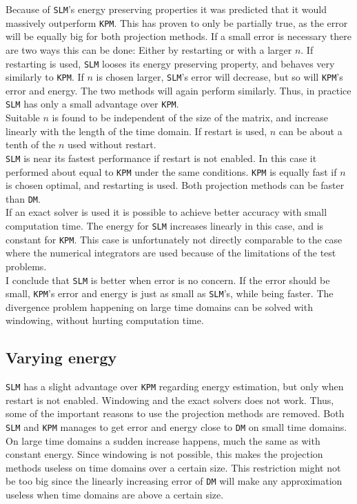 \noindent Because of \texttt{SLM}'s energy preserving properties it was predicted that it would massively outperform \texttt{KPM}. This has proven to only be partially true, as the error will be equally big for both projection methods.
If a small error is necessary there are two ways this can be done: Either by restarting or with a larger $n$. If restarting is used, \texttt{SLM} looses its energy preserving property, and behaves very similarly to \texttt{KPM}. If $n$ is chosen larger, \texttt{SLM}'s error will decrease, but so will \texttt{KPM}'s error and energy. The two methods will again perform similarly. Thus, in practice \texttt{SLM} has only a small advantage over \texttt{KPM}.\\

\noindent Suitable $n$ is found to be independent of the size of the matrix, and increase linearly with the length of the time domain. If restart is used, $n$ can be about a tenth of the $n$ used without restart.\\

\noindent \texttt{SLM} is near its fastest performance if restart is not enabled. In this case it performed about equal to \texttt{KPM} under the same conditions. \texttt{KPM} is equally fast if $n$ is chosen optimal, and restarting is used. Both projection methods can be faster than \texttt{DM}. \\

\noindent If an exact solver is used it is possible to achieve better accuracy with small computation time. The energy for \texttt{SLM} increases linearly in this case, and is constant for \texttt{KPM}. This case is unfortunately not directly comparable to the case where the numerical integrators are used because of the limitations of the test problems. \\

\noindent I conclude that \texttt{SLM} is better when error is no concern. If the error should be small, \texttt{KPM}'s error and energy is just as small as \texttt{SLM}'s, while being faster. The divergence problem happening on large time domains can be solved with windowing, without hurting computation time. %
\subsection{Varying energy} %
\texttt{SLM} has a slight advantage over \texttt{KPM} regarding energy estimation, but only when restart is not enabled. 
Windowing and the exact solvers does not work. Thus, some of the important reasons to use the projection methods are removed. Both \texttt{SLM} and \texttt{KPM} manages to get error and energy close to \texttt{DM} on small time domains. On large time domains a sudden increase happens, much the same as with constant energy. Since windowing is not possible, this makes the projection methods useless on time domains over a certain size. This restriction might not be too big since the linearly increasing error of \texttt{DM} will make any approximation useless when time domains are above a certain size.\\

